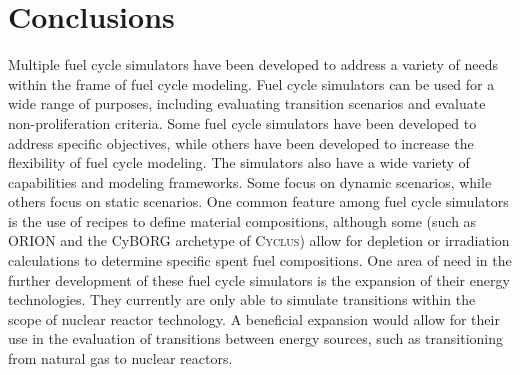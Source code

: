 \documentclass{article}
\newcommand{\Cyclus}{\textsc{Cyclus}\xspace}%
\begin{document}
    

\section{Conclusions}
    Multiple fuel cycle simulators have been developed to address a variety 
    of needs within the frame of fuel cycle modeling. Fuel cycle simulators 
    can be used for a wide range of purposes, including evaluating transition
    scenarios and evaluate non-proliferation criteria. Some fuel cycle 
    simulators have been developed to address specific objectives, while others 
    have been developed to increase the flexibility of fuel cycle modeling.
    The simulators also have a wide variety of capabilities and modeling frameworks.
    Some focus on dynamic scenarios, while others focus on static scenarios. 
    One common feature among fuel cycle simulators is the use of recipes to 
    define material compositions, although some (such as ORION and the CyBORG 
    archetype of \Cyclus) allow for depletion or irradiation calculations 
    to determine specific spent fuel compositions. One area of need in the 
    further development of these fuel cycle simulators is the expansion of their 
    energy technologies. They currently are only able to simulate transitions 
    within the scope of nuclear reactor technology. A beneficial expansion 
    would allow for their use in the evaluation of transitions between energy 
    sources, such as transitioning from natural gas to nuclear reactors. 
% 

   
\end{document}
